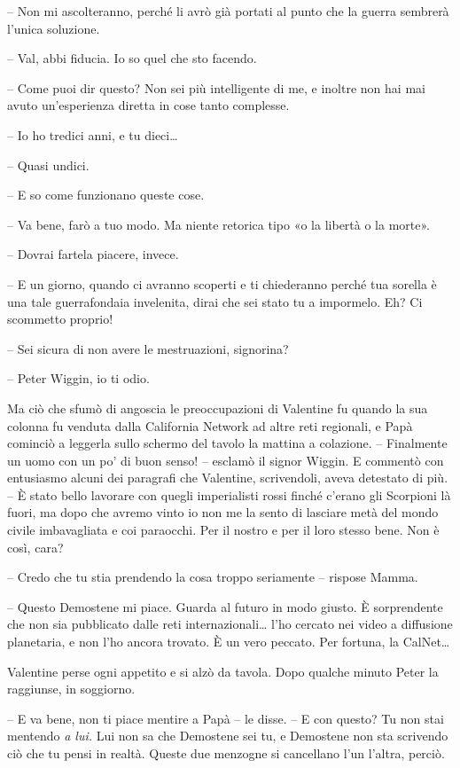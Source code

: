 {-- Non mi ascolteranno, perché li avrò già portati al punto che la
	guerra sembrerà l'unica soluzione.}

{-- Val, abbi fiducia. Io so quel che sto facendo.}

{-- Come puoi dir questo? Non sei più intelligente di me, e inoltre non
	hai mai avuto un'esperienza diretta in cose tanto complesse.}

{-- Io ho tredici anni, e tu dieci\ldots{}}

{-- Quasi undici.}

{-- E so come funzionano queste cose.}

{-- Va bene, farò a tuo modo. Ma niente retorica tipo «o la libertà o la
	morte».}

{-- Dovrai fartela piacere, invece.}

{-- E un giorno, quando ci avranno scoperti e ti chiederanno perché tua
	sorella è una tale guerrafondaia invelenita, dirai che sei stato tu a
	impormelo. Eh? Ci scommetto proprio!}

{-- Sei sicura di non avere le mestruazioni, signorina?}

{-- Peter Wiggin, io ti odio.}

{Ma ciò che sfumò di angoscia le preoccupazioni di Valentine fu quando
	la sua colonna fu venduta dalla California Network ad altre reti
	regionali, e Papà cominciò a leggerla sullo schermo del tavolo la
	mattina a colazione. -- Finalmente un uomo con un po' di buon senso! --
	esclamò il signor Wiggin. E commentò con entusiasmo alcuni dei paragrafi
	che Valentine, scrivendoli, aveva detestato di più. -- È stato bello
	lavorare con quegli imperialisti rossi finché c'erano gli Scorpioni là
	fuori, ma dopo che avremo vinto io non me la sento di lasciare metà del
	mondo civile imbavagliata e coi paraocchi. Per il nostro e per il loro
	stesso bene. Non è così, cara?}

{-- Credo che tu stia prendendo la cosa troppo seriamente -- rispose
	Mamma.}

{-- Questo Demostene mi piace. Guarda al futuro in modo giusto. È
	sorprendente che non sia pubblicato dalle reti internazionali\ldots{}
	l'ho cercato nei video a diffusione planetaria, e non l'ho ancora
	trovato. È un vero peccato. Per fortuna, la CalNet\ldots{}}

{Valentine perse ogni appetito e si alzò da tavola. Dopo qualche minuto
	Peter la raggiunse, in soggiorno.}

{-- E va bene, non ti piace mentire a Papà -- le disse. -- E con questo?
	Tu non stai mentendo \emph{a lui.} Lui non sa che Demostene sei tu, e
	Demostene non sta scrivendo ciò che tu pensi in realtà. Queste due
	menzogne si cancellano l'un l'altra, perciò.}

